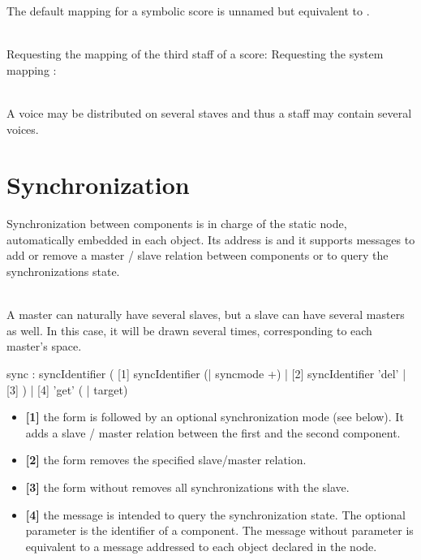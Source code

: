 \documentclass[a4paper,twoside]{report}
\newcommand{\toplevel}[1]	{\chapter{#1}}
\begin{document}
The default mapping for a symbolic score is unnamed but equivalent to .

\example \\
Requesting the mapping of the third staff of a score:
Requesting the system mapping :

\note{} \\
A voice may be distributed on several staves and thus a staff may contain several voices.


\toplevel{Synchronization}
\label{syncmsg}

Synchronization between components is in charge of the static  node, automatically embedded in each object. Its address is  and it supports messages to add or remove a master / slave relation between components or to query the synchronizations state.

\note{} \\
A master can naturally have several slaves, but a slave can have several masters as well. In this case, it will be drawn several times, corresponding to each master's space.


\begin{rail}
sync : syncIdentifier 
	 ( [1] syncIdentifier (| syncmode +) 
	   | [2] syncIdentifier 'del'
	   | [3] )
	   | [4] 'get' ( | target)
\end{rail}

\begin{itemize}
\item \textbf{[1]} the   form is followed by an optional synchronization mode (see below). It adds a slave / master relation between the first and the second component.
\item \textbf{[2]} the    form removes the specified slave/master relation.
\item \textbf{[3]} the  form without  removes all synchronizations with the slave.
\item \textbf{[4]} the  message is intended to query the synchronization state. The optional parameter is the identifier of a component. The  message without parameter is equivalent to a  message addressed to each object declared in the  node.
\end{itemize}
\end{document}
